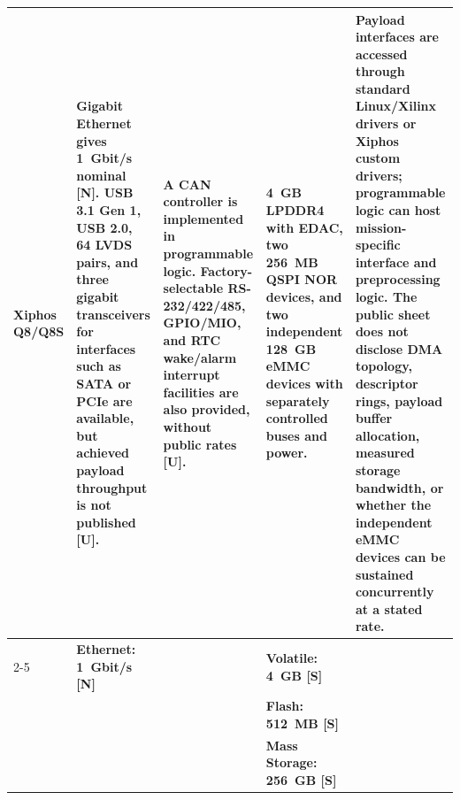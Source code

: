 \documentclass[10pt]{../datasheet}
\let\cite\citep
\begin{document}
\begin{landscape}
\begin{longtable}{|p{3.2cm}|p{4.5cm}|p{4.5cm}|p{4.5cm}|p{5.5cm}|}
    Xiphos Q8/Q8S \cite{xiphos_q8_ds}                                  &
    Gigabit Ethernet gives 1~Gbit/s nominal [N]. USB 3.1 Gen 1, USB 2.0, 64
    LVDS pairs, and three gigabit transceivers for interfaces such as SATA or
    PCIe are available, but achieved payload throughput is not published [U].
                                                                       & A CAN controller is implemented in programmable logic.
    Factory-selectable RS-232/422/485, GPIO/MIO, and RTC wake/alarm interrupt
    facilities are also provided, without public rates [U].            & 4~GB LPDDR4 with
    EDAC, two 256~MB QSPI NOR devices, and two independent 128~GB eMMC devices
    with separately controlled buses and power.                        & Payload interfaces
    are accessed through standard Linux/Xilinx drivers or Xiphos custom
    drivers; programmable logic can host mission-specific interface and
    preprocessing logic. The public sheet does not disclose DMA topology,
    descriptor rings, payload buffer allocation, measured storage bandwidth,
    or whether the independent eMMC devices can be sustained concurrently at a
    stated rate.
    \\
    \cline{2-5}
                                                                       & \textbf{Ethernet: 1~Gbit/s [N]}
                                                                       &
                                                                       & \textbf{Volatile: 4~GB [S]}                                                &                                                                                                \\
                                                                       &                                                                            &                                                  & \textbf{Flash: 512~MB [S]}                & \\
                                                                       &                                                                            &                                                  & \textbf{Mass Storage: 256~GB [S]}         & \\ \hline\hline


\end{longtable}
\end{landscape}
\end{document}
